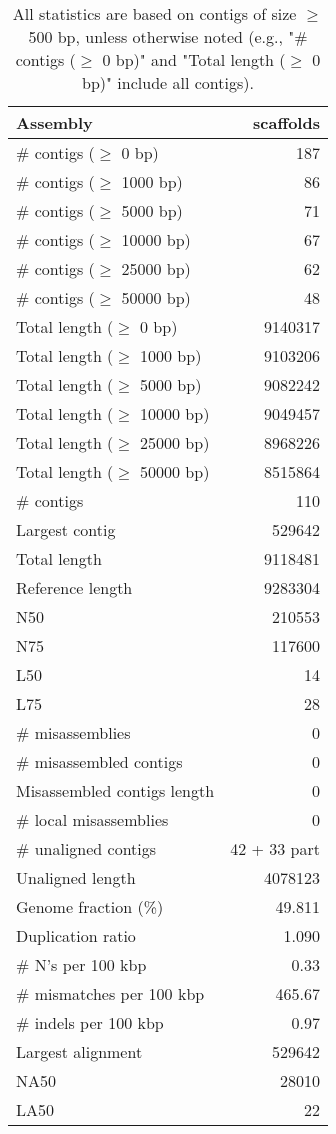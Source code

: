 \documentclass[12pt,a4paper]{article}
\begin{document}
\begin{table}[ht]
\begin{center}
\caption{All statistics are based on contigs of size $\geq$ 500 bp, unless otherwise noted (e.g., "\# contigs ($\geq$ 0 bp)" and "Total length ($\geq$ 0 bp)" include all contigs).}
\begin{tabular}{|l*{1}{|r}|}
\hline
Assembly & scaffolds \\ \hline
\# contigs ($\geq$ 0 bp) & 187 \\ \hline
\# contigs ($\geq$ 1000 bp) & 86 \\ \hline
\# contigs ($\geq$ 5000 bp) & 71 \\ \hline
\# contigs ($\geq$ 10000 bp) & 67 \\ \hline
\# contigs ($\geq$ 25000 bp) & 62 \\ \hline
\# contigs ($\geq$ 50000 bp) & 48 \\ \hline
Total length ($\geq$ 0 bp) & 9140317 \\ \hline
Total length ($\geq$ 1000 bp) & 9103206 \\ \hline
Total length ($\geq$ 5000 bp) & 9082242 \\ \hline
Total length ($\geq$ 10000 bp) & 9049457 \\ \hline
Total length ($\geq$ 25000 bp) & 8968226 \\ \hline
Total length ($\geq$ 50000 bp) & 8515864 \\ \hline
\# contigs & 110 \\ \hline
Largest contig & 529642 \\ \hline
Total length & 9118481 \\ \hline
Reference length & 9283304 \\ \hline
N50 & 210553 \\ \hline
N75 & 117600 \\ \hline
L50 & 14 \\ \hline
L75 & 28 \\ \hline
\# misassemblies & 0 \\ \hline
\# misassembled contigs & 0 \\ \hline
Misassembled contigs length & 0 \\ \hline
\# local misassemblies & 0 \\ \hline
\# unaligned contigs & 42 + 33 part \\ \hline
Unaligned length & 4078123 \\ \hline
Genome fraction (\%) & 49.811 \\ \hline
Duplication ratio & 1.090 \\ \hline
\# N's per 100 kbp & 0.33 \\ \hline
\# mismatches per 100 kbp & 465.67 \\ \hline
\# indels per 100 kbp & 0.97 \\ \hline
Largest alignment & 529642 \\ \hline
NA50 & 28010 \\ \hline
LA50 & 22 \\ \hline
\end{tabular}
\end{center}
\end{table}
\end{document}
